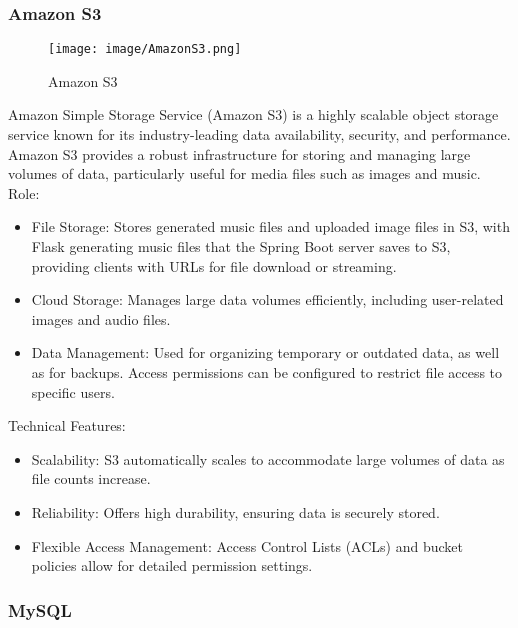 \documentclass[conference]{IEEEtran}
\begin{document}
\subsubsection{Amazon S3}

\begin{figure}[h!]
    \centering
    \texttt{[image: image/AmazonS3.png]}
    \caption{Amazon S3}
    \label{fig:enter-label}
\end{figure}

\noindent Amazon Simple Storage Service (Amazon S3) is a highly scalable object storage service known for its industry-leading data availability, security, and performance. Amazon S3 provides a robust infrastructure for storing and managing large volumes of data, particularly useful for media files such as images and music.\\

Role:
\begin{itemize}
    \item File Storage: Stores generated music files and uploaded image files in S3, with Flask generating music files that the Spring Boot server saves to S3, providing clients with URLs for file download or streaming.\\
    \item Cloud Storage: Manages large data volumes efficiently, including user-related images and audio files.\\
    \item Data Management: Used for organizing temporary or outdated data, as well as for backups. Access permissions can be configured to restrict file access to specific users.\\
\end{itemize}

Technical Features:
\begin{itemize}
    \item Scalability: S3 automatically scales to accommodate large volumes of data as file counts increase.\\
    \item Reliability: Offers high durability, ensuring data is securely stored.\\
    \item Flexible Access Management: Access Control Lists (ACLs) and bucket policies allow for detailed permission settings.\\
\end{itemize}

\subsubsection{MySQL}
\end{document}
